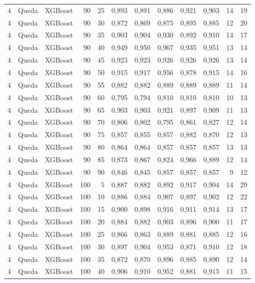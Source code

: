 \begin{longtable}{@{}rllrrrrrrrrr@{}}
4 & Queda & XGBoost & 90 & 25 & 0,893 & 0,891 & 0,886 & 0,921 & 0,903 & 14 & 19 \\
4 & Queda & XGBoost & 90 & 30 & 0,872 & 0,869 & 0,875 & 0,895 & 0,885 & 12 & 20 \\
4 & Queda & XGBoost & 90 & 35 & 0,903 & 0,904 & 0,930 & 0,892 & 0,910 & 14 & 17 \\
4 & Queda & XGBoost & 90 & 40 & 0,949 & 0,950 & 0,967 & 0,935 & 0,951 & 13 & 14 \\
4 & Queda & XGBoost & 90 & 45 & 0,923 & 0,923 & 0,926 & 0,926 & 0,926 & 13 & 14 \\
4 & Queda & XGBoost & 90 & 50 & 0,915 & 0,917 & 0,956 & 0,878 & 0,915 & 14 & 16 \\
4 & Queda & XGBoost & 90 & 55 & 0,882 & 0,882 & 0,889 & 0,889 & 0,889 & 11 & 14 \\
4 & Queda & XGBoost & 90 & 60 & 0,795 & 0,794 & 0,810 & 0,810 & 0,810 & 10 & 13 \\
4 & Queda & XGBoost & 90 & 65 & 0,903 & 0,903 & 0,921 & 0,897 & 0,909 & 11 & 13 \\
4 & Queda & XGBoost & 90 & 70 & 0,806 & 0,802 & 0,795 & 0,861 & 0,827 & 12 & 14 \\
4 & Queda & XGBoost & 90 & 75 & 0,857 & 0,855 & 0,857 & 0,882 & 0,870 & 12 & 13 \\
4 & Queda & XGBoost & 90 & 80 & 0,864 & 0,864 & 0,857 & 0,857 & 0,857 & 13 & 13 \\
4 & Queda & XGBoost & 90 & 85 & 0,873 & 0,867 & 0,824 & 0,966 & 0,889 & 12 & 14 \\
4 & Queda & XGBoost & 90 & 90 & 0,846 & 0,845 & 0,857 & 0,857 & 0,857 & 9 & 12 \\
4 & Queda & XGBoost & 100 & 5 & 0,887 & 0,882 & 0,892 & 0,917 & 0,904 & 14 & 29 \\
4 & Queda & XGBoost & 100 & 10 & 0,886 & 0,884 & 0,907 & 0,897 & 0,902 & 12 & 22 \\
4 & Queda & XGBoost & 100 & 15 & 0,900 & 0,898 & 0,916 & 0,911 & 0,914 & 13 & 17 \\
4 & Queda & XGBoost & 100 & 20 & 0,884 & 0,882 & 0,903 & 0,896 & 0,900 & 11 & 17 \\
4 & Queda & XGBoost & 100 & 25 & 0,866 & 0,863 & 0,889 & 0,881 & 0,885 & 12 & 16 \\
4 & Queda & XGBoost & 100 & 30 & 0,897 & 0,904 & 0,953 & 0,871 & 0,910 & 12 & 18 \\
4 & Queda & XGBoost & 100 & 35 & 0,872 & 0,870 & 0,896 & 0,885 & 0,890 & 12 & 14 \\
4 & Queda & XGBoost & 100 & 40 & 0,906 & 0,910 & 0,952 & 0,881 & 0,915 & 11 & 15 \\

\end{longtable}
